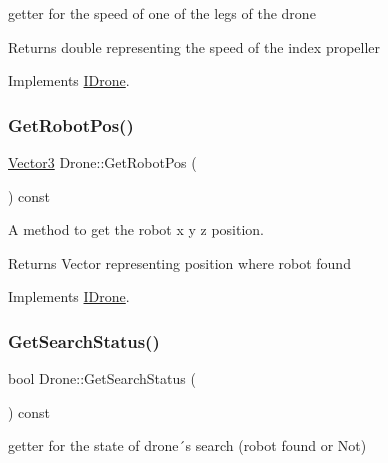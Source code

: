 getter for the speed of one of the legs of the drone 

\begin{DoxyReturn}{Returns}
double representing the speed of the index propeller 
\end{DoxyReturn}


Implements \hyperlink{classIDrone_a60a9a7eb90bf13100d66cb47b99830ed}{I\+Drone}.

\mbox{\label{classDrone_afdba5de8493255a433d62382991dfe8e}} 
\subsubsection{\texorpdfstring{Get\+Robot\+Pos()}{GetRobotPos()}}
{\footnotesize\ttfamily \hyperlink{classVector3}{Vector3} Drone\+::\+Get\+Robot\+Pos (\begin{DoxyParamCaption}{ }\end{DoxyParamCaption}) const\hspace{0.3cm}{\ttfamily [virtual]}}



A method to get the robot x y z position. 

\begin{DoxyReturn}{Returns}
Vector representing position where robot found 
\end{DoxyReturn}


Implements \hyperlink{classIDrone_a1c3f5e712a97625c74c35952b930d68d}{I\+Drone}.

\mbox{\label{classDrone_a9bfe1ce0aea1215da3072434ed8e8527}} 
\subsubsection{\texorpdfstring{Get\+Search\+Status()}{GetSearchStatus()}}
{\footnotesize\ttfamily bool Drone\+::\+Get\+Search\+Status (\begin{DoxyParamCaption}{ }\end{DoxyParamCaption}) const\hspace{0.3cm}{\ttfamily [virtual]}}



getter for the state of drone´s search (robot found or Not) 

